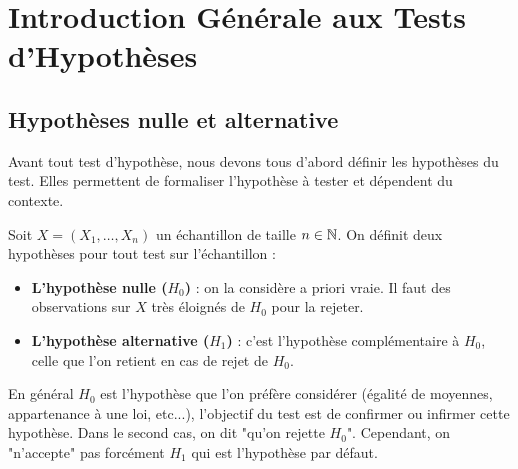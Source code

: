 
\minitoc  %





\section{Introduction Générale aux Tests d'Hypothèses}

\subsection{Hypothèses nulle et alternative}

Avant tout test d'hypothèse, nous devons tous d'abord définir les hypothèses du test. 
Elles permettent de formaliser l'hypothèse à tester et dépendent du contexte. 

\begin{definition}
    Soit $X = (X_1, \dots, X_n)$ un échantillon de taille $n \in \mathbb{N}$. On définit deux hypothèses pour tout test sur 
    l'échantillon : 
    \begin{itemize}
        \item \textbf{L'hypothèse nulle ($H_0$)} : on la considère a priori vraie. Il faut des observations sur $X$ très 
         éloignés de $H_0$ pour la rejeter. 
        \item \textbf{L'hypothèse alternative ($H_1$)} : c'est l'hypothèse complémentaire à $H_0$, celle que l'on 
        retient en cas de rejet de $H_0$. 
    \end{itemize}
\end{definition}

En général $H_0$ est l'hypothèse que l'on préfère considérer (égalité de moyennes, appartenance à une loi, etc...), 
l'objectif du test est de confirmer ou infirmer cette hypothèse. Dans le second cas, on dit "qu'on rejette $H_0$". 
Cependant, on "n'accepte" pas forcément $H_1$ qui est l'hypothèse par défaut. 

